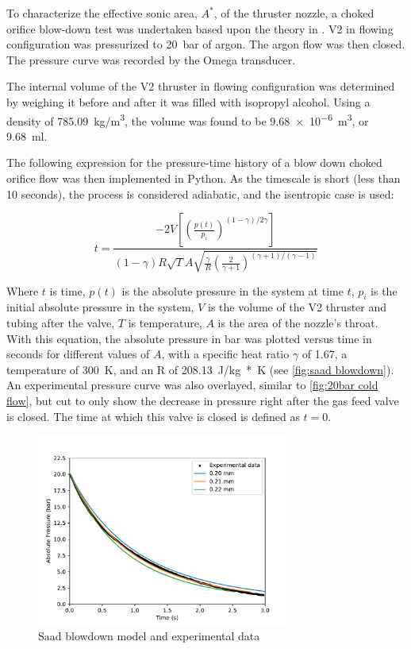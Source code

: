             To characterize the effective sonic area, $A^*$, of the thruster nozzle, a choked orifice blow-down test was undertaken based upon the theory in \textcite{saadCompressibleFluidFlow}. V2 in flowing configuration was pressurized to \qty{20}{bar} of argon. The argon flow was then closed. The pressure curve was recorded by the Omega transducer.

            The internal volume of the V2 thruster in flowing configuration was determined by weighing it before and after it was filled with isopropyl alcohol. Using a density of \qty{785.09}{kg/m^3}, the volume was found to be \qty{9.68e-6}{m^3}, or \qty{9.68}{ml}.

            The following expression for the pressure-time history of a blow down choked orifice flow \cite{saadCompressibleFluidFlow} was then implemented in Python. As the timescale is short (less than 10 seconds), the process is considered adiabatic, and the isentropic case is used:

            \begin{equation}
                t =  \frac{-2V \left[\left(\frac{p(t)}{p_i}\right)^{(1-\gamma) / 2\gamma}\right]}{(1-\gamma) R \sqrt{T} A \sqrt{\frac{\gamma}{R}(\frac{2}{\gamma + 1})^{(\gamma+1) / (\gamma-1)}}}
            \end{equation}

            Where $t$ is time, $p(t)$ is the absolute pressure in the system at time $t$, $p_i$ is the initial absolute pressure in the system, $V$ is the volume of the V2 thruster and tubing after the valve, $T$ is temperature, $A$ is the area of the nozzle's throat. With this equation, the absolute pressure in bar was plotted versus time in seconds for different values of $A$, with a specific heat ratio $\gamma$ of 1.67, a temperature of \qty{300}{K}, and an R of \qty{208.13}{J/kg*K} (see \autoref{fig:saad blowdown}). An experimental pressure curve was also overlayed, similar to \autoref{fig:20bar cold flow}, but cut to only show the decrease in pressure right after the gas feed valve is closed. The time at which this valve is closed is defined as $t=0$.

            \begin{figure}[!ht]
                \centering
                \includegraphics[width=0.75\textwidth]{assets/4 experiments/Saad blowdown fit.pdf}
                \caption{Saad blowdown model and experimental data}
                \label{fig:saad blowdown}
            \end{figure}

